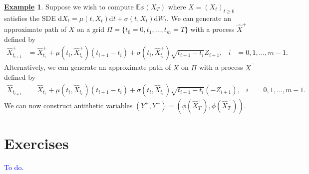 \documentclass[12pt]{book}
\let\varphi\phi
\numberwithin{equation}{chapter}
\theoremstyle{plain}
\numberwithin{theorem}{section}
\theoremstyle{definition}
\newtheorem{example}[theorem]{\underline{Example}}
\numberwithin{exercise}{chapter}
\newcommand{\<}{\langle}
\renewcommand{\>}{\rangle}
\renewcommand{\(}{\left(}
\renewcommand{\)}{\right)}
\renewcommand{\[}{\left[}
\renewcommand{\]}{\right]}
\newcommand\Eb{\mathds{E}}
\newcommand\sig{\sigma}
\newcommand\Xh{\widehat{X}}
\newcommand\dd{\mathrm{d}}
\newcommand{\blu}[1]{\textcolor{blue}{#1}}
\begin{document}
\begin{example}
Suppose we wish to compute $\Eb \varphi(X_T)$ where $X = (X_t)_{t \geq 0}$ satisfies the SDE $\dd X_t = \mu(t,X_t) \dd t + \sig(t,X_t) \dd W_t$.  
We can generate an approximate path of $X$ on a grid $\Pi=\{t_0=0, t_1, \ldots, t_m = T \}$ with a process $\Xh^+$ defined by
\begin{align}
\Xh_{t_{i+1}}^+
	&=	\Xh_{t_i}^+ + \mu( t_i, \Xh_{t_i}^+) (t_{i+1} - t_i) + \sig( t_i, \Xh_{t_i}^+) \sqrt{t_{i+1} - t_i} Z_{i+1} , &
i
	&=	0, 1, \ldots, m-1 .
\end{align}
Alternatively, we can generate an approximate path of $X$ on $\Pi$ with a process $\Xh^-$ defined by
\begin{align}
\Xh_{t_{i+1}}^-
	&=	\Xh_{t_i}^- + \mu( t_i, \Xh_{t_i}^-) (t_{i+1} - t_i) + \sig( t_i, \Xh_{t_i}^-) \sqrt{t_{i+1} - t_i} (- Z_{i+1} ), &
i
	&=	0, 1, \ldots, m-1 .
\end{align}
We can now construct antithetic variables $(Y^+,Y^-) = (\varphi(\Xh_T^+),\varphi(\Xh_T^-))$.
\end{example}


\section{Exercises}
\label{sec:exercises-13}
\blu{To do.}

%
%
\end{document}

